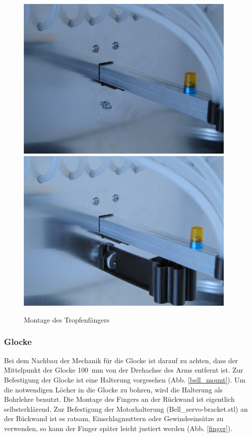 \documentclass[a4paper]{scrartcl}
\begin{document}
\begin{figure}
  \centering
  \includegraphics[height=8cm]{pics/nodrip.jpg}
  \includegraphics[height=8cm]{pics/yodrip.jpg}
  \caption{Montage des Tropfenfängers} \label{drip}
\end{figure}

\subsubsection{Glocke}
Bei dem Nachbau der Mechanik für die Glocke ist darauf zu achten, dass der Mittelpunkt der Glocke \SI{100}{\milli\metre} von der Drehachse des Arms entfernt ist. Zur Befestigung der Glocke ist eine Halterung vorgesehen (Abb. \ref{bell_mount}). Um die notwendigen Löcher in die Glocke zu bohren, wird die Halterung als Bohrlehre benutzt. Die Montage des Fingers an der Rückwand ist eigentlich selbsterklärend. Zur Befestigung der Motorhalterung (Bell\_servo-bracket.stl) an der Rückwand ist es ratsam, Einschlagmuttern oder Gewindeeinsätze zu verwenden, so kann der Finger später leicht justiert werden (Abb. \ref{finger}).
\end{document}
